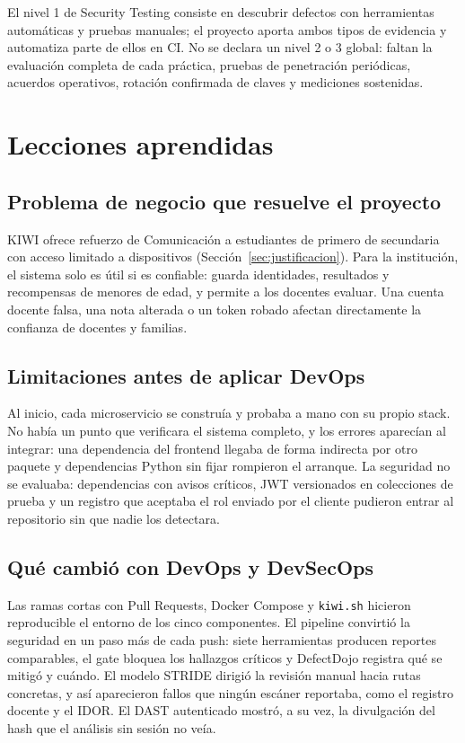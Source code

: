 \documentclass[12pt,a4paper]{article}
\begin{document}
El nivel 1 de Security Testing consiste en descubrir defectos con herramientas automáticas y pruebas
manuales; el proyecto aporta ambos tipos de evidencia y automatiza parte de ellos en CI. No se
declara un nivel 2 o 3 global: faltan la evaluación completa de cada práctica, pruebas de
penetración periódicas, acuerdos operativos, rotación confirmada de claves y mediciones sostenidas.

\section{Lecciones aprendidas}
\label{sec:lecciones}

\subsection{Problema de negocio que resuelve el proyecto}

KIWI ofrece refuerzo de Comunicación a estudiantes de primero de secundaria con acceso limitado a
dispositivos (Sección~\ref{sec:justificacion}). Para la institución, el sistema solo es útil si es
confiable: guarda identidades, resultados y recompensas de menores de edad, y permite a los docentes
evaluar. Una cuenta docente falsa, una nota alterada o un token robado afectan directamente la
confianza de docentes y familias.

\subsection{Limitaciones antes de aplicar DevOps}

Al inicio, cada microservicio se construía y probaba a mano con su propio stack. No había un punto
que verificara el sistema completo, y los errores aparecían al integrar: una dependencia del
frontend llegaba de forma indirecta por otro paquete y dependencias Python sin fijar rompieron el
arranque. La seguridad no se evaluaba: dependencias con avisos críticos, JWT versionados en
colecciones de prueba y un registro que aceptaba el rol enviado por el cliente pudieron entrar al
repositorio sin que nadie los detectara.

\subsection{Qué cambió con DevOps y DevSecOps}

Las ramas cortas con Pull Requests, Docker Compose y \texttt{kiwi.sh} hicieron reproducible el
entorno de los cinco componentes. El pipeline convirtió la seguridad en un
paso más de cada push: siete herramientas producen reportes comparables, el gate bloquea los
hallazgos críticos y DefectDojo registra qué se mitigó y cuándo. El modelo STRIDE dirigió la
revisión manual hacia rutas concretas, y así aparecieron fallos que ningún escáner reportaba, como
el registro docente y el IDOR. El DAST autenticado mostró, a su vez, la divulgación del hash que el
análisis sin sesión no veía.
\end{document}
